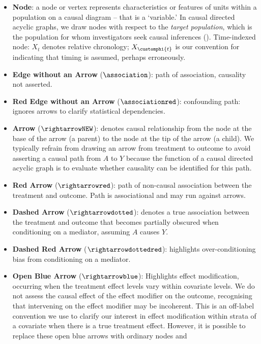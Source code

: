 \documentclass[
  single column]{article}
\begin{document}
\begin{itemize}
\item
  \textbf{Node}: a node or vertex represents characteristics or features
  of units within a population on a causal diagram -- that is a
  `variable.' In causal directed acyclic graphs, we draw nodes with
  respect to the \emph{target population}, which is the population for
  whom investigators seek causal inferences
  (). Time-indexed node:
  \(X_t\) denotes relative chronology; \(X_{\customphi{t}}\) is our
  convention for indicating that timing is assumed, perhaps erroneously.
\item
  \textbf{Edge without an Arrow} (\(\association\)): path of
  association, causality not asserted.
\item
  \textbf{Red Edge without an Arrow} (\(\associationred\)): confounding
  path: ignores arrows to clarify statistical dependencies.
\item
  \textbf{Arrow} (\(\rightarrowNEW\)): denotes causal relationship from
  the node at the base of the arrow (a parent) to the node at the tip of
  the arrow (a child). We typically refrain from drawing an arrow from
  treatment to outcome to avoid asserting a causal path from \(A\) to
  \(Y\) because the function of a causal directed acyclic graph is to
  evaluate whether causality can be identified for this path.
\item
  \textbf{Red Arrow} (\(\rightarrowred\)): path of non-causal
  association between the treatment and outcome. Path is associational
  and may run against arrows.
\item
  \textbf{Dashed Arrow} (\(\rightarrowdotted\)): denotes a true
  association between the treatment and outcome that becomes partially
  obscured when conditioning on a mediator, assuming \(A\) causes \(Y\).
\item
  \textbf{Dashed Red Arrow} (\(\rightarrowdottedred\)): highlights
  over-conditioning bias from conditioning on a mediator.
\item
  \textbf{Open Blue Arrow} (\(\rightarrowblue\)): Highlights effect
  modification, occurring when the treatment effect levels vary within
  covariate levels. We do not assess the causal effect of the effect
  modifier on the outcome, recognising that intervening on the effect
  modifier may be incoherent. This is an off-label convention we use to
  clarify our interest in effect modification within strata of a
  covariate when there is a true treatment effect. However, it is
  possible to replace these open blue arrows with ordinary nodes and

\end{itemize}
\end{document}
